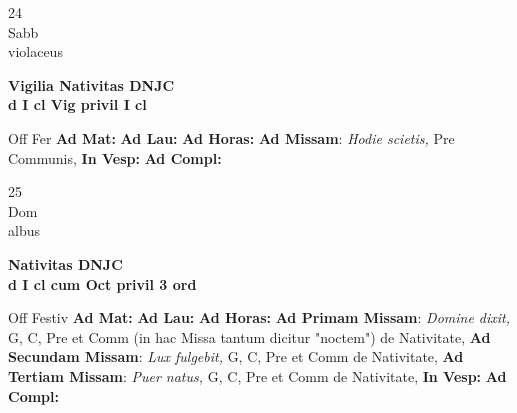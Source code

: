 \documentclass[10pt, openany]{book}
\begin{document}
        \begin{center}
            \begin{minipage}{3.5in}
                \vspace{2em}
                \begin{minipage}{0.5in}
                    {\Huge 24} \\
                    {\normalsize Sabb} \\
                    {\normalsize violaceus}
                \end{minipage}
                \begin{minipage}{3.0in}
                    \textbf{ \large Vigilia Nativitas DNJC \\
                    \textnormal{\normalsize d I cl Vig privil I cl}} \\ 
                \end{minipage}
                \begin{justify}Off Fer
                    \textbf{Ad Mat: }
                    \textbf{Ad Lau: }
                    \textbf{Ad Horas: }\textbf{Ad Missam}: \textit{Hodie scietis,} Pre Communis,  
                    \textbf{In Vesp: }
                    \textbf{Ad Compl: }
                \end{justify}
            \end{minipage}
        \end{center}
    
        \begin{center}
            \begin{minipage}{3.5in}
                \vspace{2em}
                \begin{minipage}{0.5in}
                    {\Huge 25} \\
                    {\normalsize Dom} \\
                    {\normalsize albus}
                \end{minipage}
                \begin{minipage}{3.0in}
                    \textbf{ \large Nativitas DNJC \\
                    \textnormal{\normalsize d I cl cum Oct privil 3 ord}} \\ 
                \end{minipage}
                \begin{justify}Off Festiv
                    \textbf{Ad Mat: }
                    \textbf{Ad Lau: }
                    \textbf{Ad Horas: }\textbf{Ad Primam Missam}: \textit{Domine dixit,} G, C, Pre et Comm (in hac Missa tantum dicitur "noctem") de Nativitate,  \textbf{Ad Secundam Missam}: \textit{Lux fulgebit,} G, C, Pre et Comm de Nativitate,  \textbf{Ad Tertiam Missam}: \textit{Puer natus,} G, C, Pre et Comm de Nativitate,  
                    \textbf{In Vesp: }
                    \textbf{Ad Compl: }
                \end{justify}
            \end{minipage}
        \end{center}
    
\end{document}
